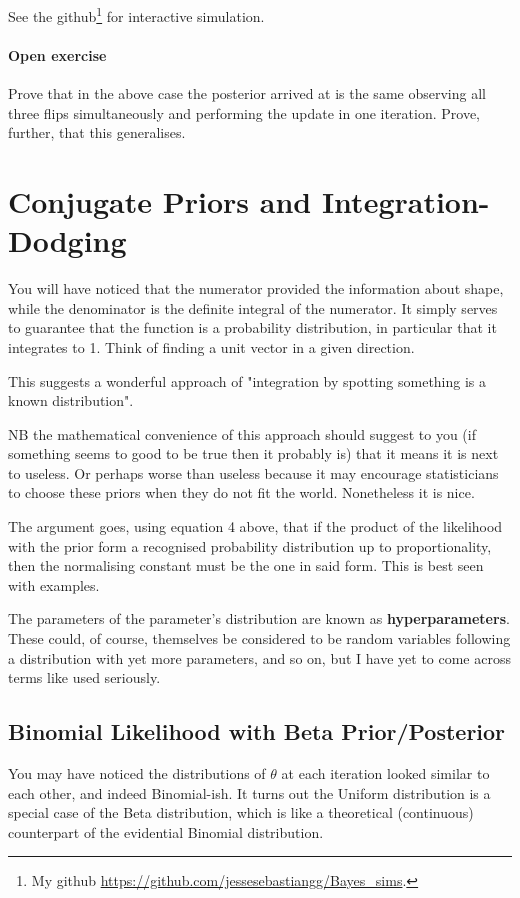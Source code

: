 \documentclass{article}
\begin{document}
See the github\footnote{My github \url{https://github.com/jessesebastiangg/Bayes_sims}.} for interactive simulation.

\begin{Exercise}
\paragraph{Open exercise}
    Prove that in the above case the posterior arrived at is the same observing all three flips simultaneously and performing the update in one iteration.
    Prove, further, that this generalises.
\end{Exercise}

\newpage{}

\section{Conjugate Priors and Integration-Dodging}
You will have noticed that the numerator provided the information about shape, while the denominator is the definite integral of the numerator. It simply serves to guarantee that the function is a probability distribution, in particular that it integrates to 1. Think of finding a unit vector in a given direction.

This suggests a wonderful approach of "integration by spotting something is a known distribution".

NB the mathematical convenience of this approach should suggest to you (if something seems to good to be true then it probably is) that it means it is next to useless. Or perhaps worse than useless because it may encourage statisticians to choose these priors when they do not fit the world. Nonetheless it is nice.

The argument goes, using equation 4 above, that if the product of the likelihood with the prior form a recognised probability distribution up to proportionality, then the normalising constant must be the one in said form. This is best seen with examples.

The parameters of the parameter's distribution are known as \textbf{hyperparameters}. These could, of course, themselves be considered to be random variables following a distribution with yet more parameters, and so on, but I have yet to come across terms like  used seriously.

\subsection{Binomial Likelihood with Beta Prior/Posterior}
You may have noticed the distributions of $\theta$ at each iteration looked similar to each other, and indeed Binomial-ish. It turns out the Uniform distribution is a special case of the Beta distribution, which is like a theoretical (continuous) counterpart of the evidential Binomial distribution.
\end{document}
